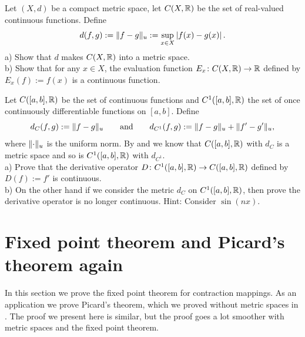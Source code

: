 \begin{exercise}
Let $(X,d)$ be a compact metric space, let $C(X,{\mathbb{R}})$ be the set
of real-valued continuous functions.  Define
\begin{equation*}
d(f,g) := \lVert {f-g} \rVert_u := \sup_{x \in X} \left\lvert {f(x)-g(x)} \right\rvert .
\end{equation*}
a) Show that $d$ makes $C(X,{\mathbb{R}})$ into a metric space.\\
b) Show that for any $x \in X$, the evaluation function
$E_x \colon C(X,{\mathbb{R}}) \to {\mathbb{R}}$ defined by $E_x(f) := f(x)$
is a continuous function.
\end{exercise}

\begin{samepage}
\begin{exercise}
Let $C([a,b],{\mathbb{R}})$ be the set of continuous functions and
$C^1([a,b],{\mathbb{R}})$ the set of once continuously differentiable
functions on $[a,b]$.
Define
\begin{equation*}
d_{C}(f,g) := \lVert {f-g} \rVert_u
\qquad \text{and} \qquad
d_{C^1}(f,g) := \lVert {f-g} \rVert_u + \lVert {f'-g'} \rVert_u,
\end{equation*}
where $\lVert {\cdot} \rVert_u$ is the uniform norm.
By  and  we know that
$C([a,b],{\mathbb{R}})$ with $d_C$ is a metric space and
so is
$C^1([a,b],{\mathbb{R}})$ with $d_{C^1}$.\\
a) Prove that the derivative operator $D \colon 
C^1([a,b],{\mathbb{R}}) \to C([a,b],{\mathbb{R}})$ defined by
$D(f) := f'$ is continuous.
\\
b) On the other hand if we consider the metric $d_C$ on $C^1([a,b],{\mathbb{R}})$,
then prove the derivative operator is no longer continuous.  Hint: Consider
$\sin(n x)$.
\end{exercise}
\end{samepage}


\sectionnewpage
\section{Fixed point theorem and Picard's theorem again}
\label{sec:metpicard}


In this section we prove the fixed point theorem for contraction
mappings.  As an application we prove Picard's theorem, which we proved
without metric spaces in .
The proof we present here is similar, but the proof goes a lot
smoother with metric spaces and the fixed point theorem.

